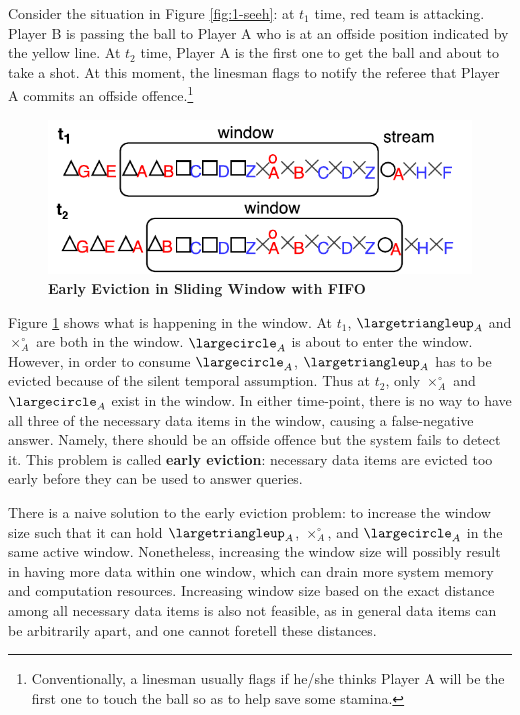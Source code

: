 Consider the situation in Figure \ref{fig:1-seeh}:
at $t_{1}$ time, red team is attacking.
Player B is passing the ball to Player A who is at an offside position indicated by the yellow line. 
At $t_{2}$ time, Player A is the first one to get the ball and about to take a shot.
At this moment, the linesman flags to notify the referee that Player A commits an offside offence.\footnote{Conventionally, a linesman usually flags if he/she thinks Player A will be the first one to touch the ball so as to help save some stamina.}

\begin{figure}[!htbp]
	\centering
	\includegraphics[width=5in]{img/1-seew.pdf}
	\caption{\textbf{Early Eviction in Sliding Window with FIFO}}
	\label{fig:1-seew} 
\end{figure}

Figure \ref{fig:1-seew} shows what is happening in the window. 
At $t_{1}$, $\largetriangleup_{A}$ and $\times^{\circ}_{A}$ are both in the window. 
$\largecircle_{A}$ is about to enter the window. 
However, in order to consume $\largecircle_{A}$, $\largetriangleup_{A}$ has to be evicted because of the silent temporal assumption. 
Thus at $t_{2}$, only $\times^{\circ}_{A}$ and $\largecircle_{A}$ exist in the window. 
In either time-point, there is no way to have all three of the necessary data items in the window, causing a false-negative answer. 
Namely, there should be an offside offence but the system fails to detect it. 
This problem is called \textbf{early eviction}: necessary data items are evicted too early before they can be used to answer queries. 

There is a naive solution to the early eviction problem: 
to increase the window size such that it can hold $\largetriangleup_{A}$, $\times^{\circ}_{A}$, and $\largecircle_{A}$ in the same active window.
Nonetheless, increasing the window size will possibly result in having more data within one window, which can drain more system memory and computation resources. 
Increasing window size based on the exact distance among all necessary data items is also not feasible, as in general data items can be arbitrarily apart, and one cannot foretell these distances.
%
